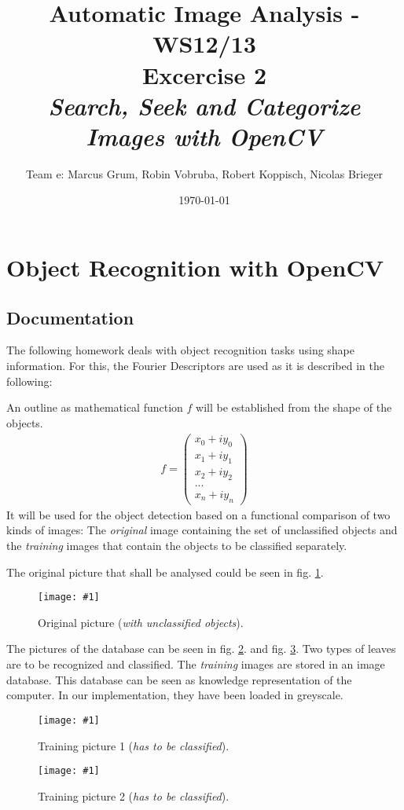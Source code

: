 \documentclass[a4paper,headings=small]{scrartcl}
\title{Automatic Image Analysis - WS12/13 \\ Excercise 2 \\ \emph{Search, Seek and Categorize Images with OpenCV}}
\author{Team e: Marcus Grum, Robin Vobruba, Robert Koppisch, Nicolas Brieger}
\date{\today}
\numberwithin{equation}{section} %
\numberwithin{figure}{section}   %
\newcommand{\image}[3]{
	\begin{figure}[htbp]
		\centering
		\texttt{[image: \#1]}
		\caption{#3}
		\label{fig:#1}
	\end{figure}
}
\begin{document}
\maketitle



\section{Object Recognition with OpenCV}


\subsection{Documentation}

The following homework deals with object recognition tasks using shape information.
For this, the Fourier Descriptors are used as it is described in the following:

An outline as mathematical function $f$ will be established from the shape of the objects.
\begin{align}
f=\begin{pmatrix} x_0 + i y_0 \\ x_1 + i y_1 \\ x_2 + i y_2 \\ ... \\ x_n + i y_n \end{pmatrix} 
\end{align}
It will be used for the object detection based on a functional comparison of two kinds of images:
The \emph{original} image containing the set of unclassified objects 
and the \emph{training} images that contain the objects to be classified separately.

The original picture that shall be analysed could be seen in fig. \ref{fig:../../../target/pic_input}.

\image{../../../target/pic_input}{1}{%
		Original picture (\emph{with unclassified objects}).}

The pictures of the database can be seen in fig. \ref{fig:../../../target/pic_db1}.
and fig. \ref{fig:../../../target/pic_db2}. Two types of leaves are to be
recognized and classified. The \emph{training} images are stored in an image database. 
This database can be seen as knowledge representation of the computer. 
In our implementation, they have been loaded in greyscale.

\image{../../../target/pic_db1}{0.2}{%
		Training picture 1 (\emph{has to be classified}).}
\image{../../../target/pic_db2}{0.5}{%
		Training picture 2 (\emph{has to be classified}).}
\end{document}
